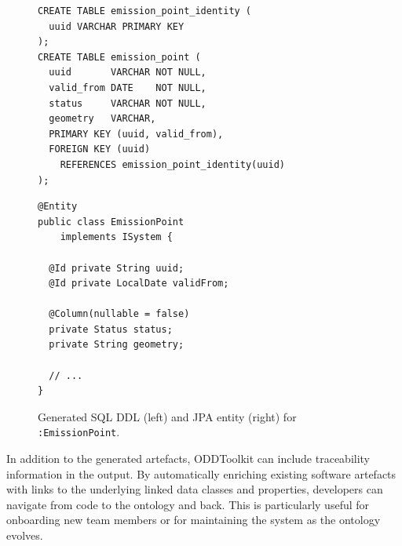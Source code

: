 \begin{figure}[ht]
\noindent
\footnotesize
\begin{minipage}[t]{0.45\linewidth}
\begin{verbatim}
CREATE TABLE emission_point_identity (
  uuid VARCHAR PRIMARY KEY
);
CREATE TABLE emission_point (
  uuid       VARCHAR NOT NULL,
  valid_from DATE    NOT NULL,
  status     VARCHAR NOT NULL,
  geometry   VARCHAR,
  PRIMARY KEY (uuid, valid_from),
  FOREIGN KEY (uuid)
    REFERENCES emission_point_identity(uuid)
);
\end{verbatim}
\end{minipage}%
\hfill%
\begin{minipage}[t]{0.45\linewidth}
\begin{verbatim}
@Entity
public class EmissionPoint
    implements ISystem {

  @Id private String uuid;
  @Id private LocalDate validFrom;

  @Column(nullable = false)
  private Status status;
  private String geometry;

  // ...
}
\end{verbatim}
\end{minipage}
\caption{Generated SQL DDL (left) and JPA entity (right) for \texttt{:EmissionPoint}.}
\label{lst:sql-java}
\end{figure}

In addition to the generated artefacts, ODDToolkit can include traceability information in the output. By automatically enriching existing software artefacts with links to the underlying linked data classes and properties, developers can navigate from code to the ontology and back. This is particularly useful for onboarding new team members or for maintaining the system as the ontology evolves.